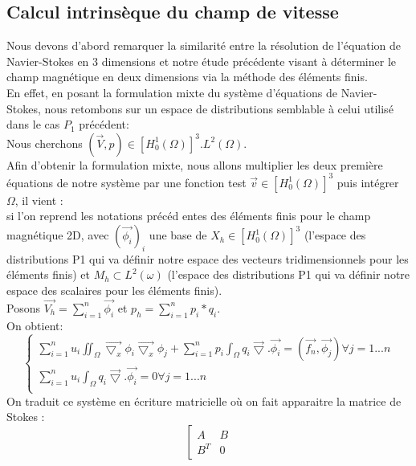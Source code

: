 \documentclass[a4paper,12pt,titlepage]{report}
\begin{document}
\begin{onehalfspace}
\subsection{Calcul intrinsèque du champ de vitesse}
Nous devons d'abord remarquer la similarité entre la résolution de l'équation de Navier-Stokes en 3 dimensions et notre étude précédente visant à déterminer le champ magnétique en deux dimensions via la méthode des éléments finis. 
\\
En effet, en posant la formulation mixte du système d'équations de Navier-Stokes, nous retombons sur un espace de distributions semblable à celui utilisé dans le cas $P_1$ précédent:
\\
Nous cherchons $(\vec{V},p) \in [H_0^1(\Omega)]^3.L^2(\Omega) $.
\\
Afin d’obtenir la formulation mixte, nous allons multiplier les deux première équations de notre
système par une fonction test $\vec{v} \in [H_0^1(\Omega)]^3$ puis intégrer $\Omega$, il vient :
\[
\]
si l'on reprend les notations précéd entes des éléments finis pour le champ magnétique 2D, avec $(\vec{\phi_i})_i$ une base de $X_h \in [H_0^1(\Omega)]^3$ (l'espace des distributions P1 qui va définir notre espace des vecteurs tridimensionnels pour les éléments finis) et $M_h \subset L^2(\omega)$ (l'espace des distributions P1 qui va définir notre espace des scalaires pour les éléments finis).
\\
Posons $\vec{V_h} =\sum_{i=1}^n\vec{\phi_i}$ et $p_h=\sum_{i=1}^n p_i*q_i$.
\\
On obtient:
\newline
\[	
  \left\{
    \begin{aligned}
    \sum_{i=1}^n u_i \iint_{\Omega}\vec{\bigtriangledown_{x}}{\phi_{i}} \vec{\bigtriangledown_{x}}{\phi_{j}} + \sum_{i=1}^n p_i \int_{\Omega} q_i \vec{\bigtriangledown}. \vec{\phi_i} = (\vec{f_n},\vec{\phi_j}) \forall j =1...n\\
    \sum_{i=1}^n u_i \int_{\Omega} q_i \vec{\bigtriangledown}. \vec{\phi_i} = 0 \forall j =1...n\\
	 \end{aligned}
  \right.
\]
On traduit ce système en écriture matricielle où on fait apparaitre la matrice de Stokes :
\\
\[
\left[
\begin{array}{ccc}
  A &  B   \\
  B^T  & 0

\end{array}\]
\end{onehalfspace}
\end{document}

